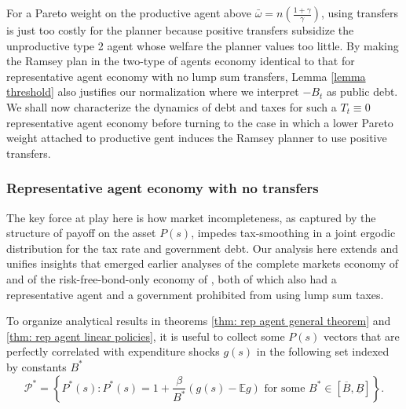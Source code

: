 \documentclass[thmsb,11pt]{article}
\begin{document}
For a Pareto weight on the productive agent above  $\bar{\omega}=n\left(\frac{1+\gamma}{\gamma}\right)$,
using transfers is just too costly for the planner because positive  transfers   subsidize the unproductive type 2 agent
whose  welfare the planner  values too little. By making the Ramsey plan in the
two-type of agents economy identical to that for  representative agent economy with no lump sum transfers, 
Lemma \ref{lemma threshold} also justifies our normalization where we interpret $-B_t$ as public debt.  
We shall now characterize the dynamics of debt and taxes for such a $T_t \equiv 0$ representative agent economy
before turning to the case in which a lower Pareto weight attached to productive gent induces the Ramsey planner to use positive transfers.
 

\subsubsection{Representative agent economy with no transfers}
The key force at play here is how market incompleteness, as captured by the structure of payoff on the asset $P(s)$, 
impedes  tax-smoothing  in a joint ergodic distribution for the tax rate and government debt.
Our analysis here  extends and unifies  insights that  emerged earlier analyses of  the complete markets economy of \cite{LucasJr.1983} and 
of the risk-free-bond-only economy of  \citep{Aiyagari2002}, both of which also had a representative agent and a government prohibited
from using lump sum taxes. 

To organize analytical results in theorems \ref{thm: rep agent general theorem} and \ref{thm: rep agent linear policies}, it is useful to  collect some  $P(s)$ vectors that are perfectly correlated with expenditure shocks $g(s)$ in the
following  set %
 indexed by  constants $B^*$  %
\begin{equation}\label{eqn:setP}
 \mathcal{P}^*=\left\{P^*(s): P^*(s) = 1+ \frac{\beta}{ B^*}(g(s) - \mathbb{E} g) \text{ for some } B^*\in[\overline{B},\underline{B}] \right\}.
 \end{equation}



\end{document}
